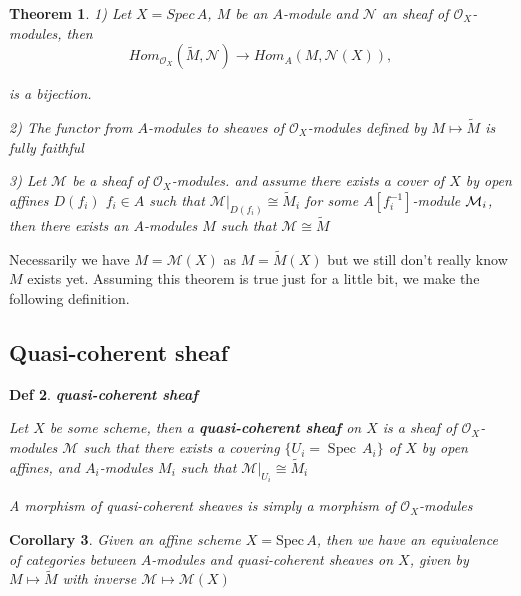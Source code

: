 \documentclass{article}
\newtheorem{theorem}{Theorem}[section]
\newtheorem{definition}[theorem]{Def}
\newtheorem{corollary}[theorem]{Corollary}
\begin{document}
\begin{theorem}

1) Let $X=Spec\, A$, $M$ be an $A$-module and $\mathcal N$ an sheaf of $\mathcal O_X$-modules, then 
$$
Hom_{\mathcal{O}_{X}} (\widetilde M, \mathcal N ) \to Hom_A(M, \mathcal N (X)),
$$

is a bijection.

2) The functor from $A$-modules to sheaves of ${\mathcal{O}}_{X}$-modules defined by $M\mapsto{\widetilde{{M}}}$ is fully faithful
    
3) Let $\mathcal M$ be a sheaf of ${\mathcal{O}}_{X}$-modules. and assume there exists a cover of $X$ by open affines $D(f_{i})$  $f_{i}\in A$ such that $\mathcal{M}|_{D(f_{i})}\cong\widetilde{M}_{i}$ for some $A[f_{i}^{-1}]$-module ${\cal M}_{i}$, then there exists an $A$-modules ${M}$ such that $\mathcal{M}\cong\widetilde{M}$ 
\label{Thm 3.45}
\end{theorem}



Necessarily we have $M={\mathcal{M}}(X)$ as $M={\widetilde{M}}(X)$  but we still don't really know $M$ exists yet. Assuming this theorem is true just for a little bit, we make the following definition.




\newpage
\subsection{Quasi-coherent sheaf}
\begin{definition}
\textbf{quasi-coherent sheaf}

    Let $X$ be some scheme, then a \textbf{quasi-coherent sheaf} on $X$ is a sheaf of ${\mathcal{O}}_{X}$-modules $\mathcal M$ such that there exists a covering $\{U_{i}=\operatorname{Spec}\,A_{i}\}$ of $X$ by open affines, and $A_{i}$-modules ${M}_{i}$ such that $\mathcal{M}|_{U_{i}}\cong\widetilde{M}_{i}$

    A morphism of quasi-coherent sheaves is simply a morphism of ${\mathcal{O}}_{X}$-modules
\end{definition} 

\begin{corollary}
    Given an affine scheme $X =\mathrm{Spec}\, A$, then we have an equivalence of categories between $A$-modules and quasi-coherent sheaves on $X$, given by $M \mapsto \widetilde M$ with inverse $\mathcal M \mapsto \mathcal M(X)$
\end{corollary}
\end{document}
